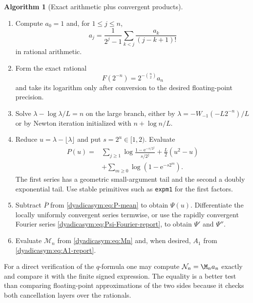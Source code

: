 \documentclass[11pt,oneside]{article}
\theoremstyle{definition}
\newtheorem{algorithm}[theorem]{Algorithm}
\theoremstyle{remark}
\newcommand{\e}{\mathrm e}
\begin{document}
\begin{algorithm}[Exact arithmetic plus convergent products]
\label{dyadicasym:alg:numerics}
\leavevmode
\begin{enumerate}
\item Compute $a_0=1$ and, for $1\le j\le n$,
\begin{equation*}
 a_j=\frac1{2^j-1}\sum_{k<j}\frac{a_k}{(j-k+1)!}
\end{equation*}
in rational arithmetic.

\item Form the exact rational
\begin{equation*}
 F(2^{-n})=2^{-\binom n2}a_n
\end{equation*}
and take its logarithm only after conversion to the desired floating-point precision.

\item Solve $\lambda-\log\lambda/L=n$ on the large branch, either by
$\lambda=-W_{-1}(-L2^{-n})/L$ or by Newton iteration initialized with
$n+\log n/L$.

\item Reduce $u=\lambda-\lfloor\lambda\rfloor$ and put $s=2^u\in[1,2)$.  Evaluate
\begin{align*}
 P(u)={}&\sum_{j\ge1}\log\frac{1-\e^{-s/2^j}}{s/2^j}
 +\frac L2(u^2-u)\\
 &+\sum_{m\ge0}\log(1-\e^{-s2^m}).
\end{align*}
The first series has a geometric small-argument tail and the second a doubly exponential tail.
Use stable primitives such as \texttt{expm1} for the first factors.

\item Subtract $\overline P$ from \eqref{dyadicasym:eq:P-mean} to obtain $\Psi(u)$.  Differentiate the
locally uniformly convergent series termwise, or use the rapidly convergent Fourier series
\eqref{dyadicasym:eq:Psi-Fourier-report}, to obtain $\Psi'$ and $\Psi''$.

\item Evaluate $\mathcal M_n$ from \eqref{dyadicasym:eq:Mn} and, when desired, $A_1$ from
\eqref{dyadicasym:eq:A1-report}.
\end{enumerate}
\end{algorithm}

For a direct verification of the $q$-formula one may compute
$\mathcal N_n=\M_na_n$ exactly and compare it with the finite signed expression.  The equality
is a better test than comparing floating-point approximations of the two sides because it
checks both cancellation layers over the rationals.
\end{document}
